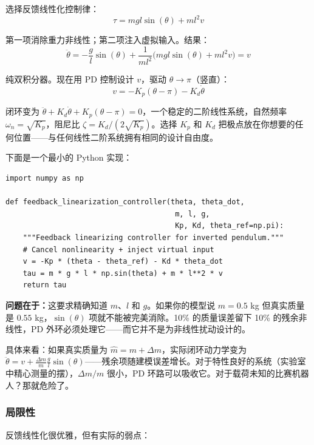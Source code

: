 选择反馈线性化控制律：
\begin{equation}
\tau = mgl\sin(\theta) + ml^2 v
\end{equation}

第一项消除重力非线性；第二项注入虚拟输入。结果：
\begin{equation}
\ddot{\theta} = -\frac{g}{l}\sin(\theta) + \frac{1}{ml^2}\bigl(mgl\sin(\theta) + ml^2 v\bigr) = v
\end{equation}

纯双积分器。现在用 PD 控制设计 $v$，驱动 $\theta \to \pi$（竖直）：
\begin{equation}
v = -K_p(\theta - \pi) - K_d \dot{\theta}
\end{equation}

闭环变为 $\ddot{\theta} + K_d \dot{\theta} + K_p(\theta - \pi) = 0$，一个稳定的二阶线性系统，自然频率 $\omega_n = \sqrt{K_p}$，阻尼比 $\zeta = K_d / (2\sqrt{K_p})$。选择 $K_p$ 和 $K_d$ 把极点放在你想要的任何位置——与任何线性二阶系统拥有相同的设计自由度。

下面是一个最小的 Python 实现：

\begin{verbatim}
import numpy as np

def feedback_linearization_controller(theta, theta_dot,
                                       m, l, g,
                                       Kp, Kd, theta_ref=np.pi):
    """Feedback linearizing controller for inverted pendulum."""
    # Cancel nonlinearity + inject virtual input
    v = -Kp * (theta - theta_ref) - Kd * theta_dot
    tau = m * g * l * np.sin(theta) + m * l**2 * v
    return tau
\end{verbatim}

\textbf{问题在于：}这要求精确知道 $m$、$l$ 和 $g$。如果你的模型说 $m = 0.5$ kg 但真实质量是 $0.55$ kg，$\sin(\theta)$ 项就不能被完美消除。10\% 的质量误差留下 10\% 的残余非线性，PD 外环必须处理它——而它并不是为非线性扰动设计的。

具体来看：如果真实质量为 $\hat{m} = m + \Delta m$，实际闭环动力学变为 $\ddot{\theta} = v + \frac{\Delta m}{m} \frac{g}{l}\sin(\theta)$——残余项随建模误差增长。对于特性良好的系统（实验室中精心测量的摆），$\Delta m / m$ 很小，PD 环路可以吸收它。对于载荷未知的比赛机器人？那就危险了。

\subsubsection{局限性}

反馈线性化很优雅，但有实际的弱点：

